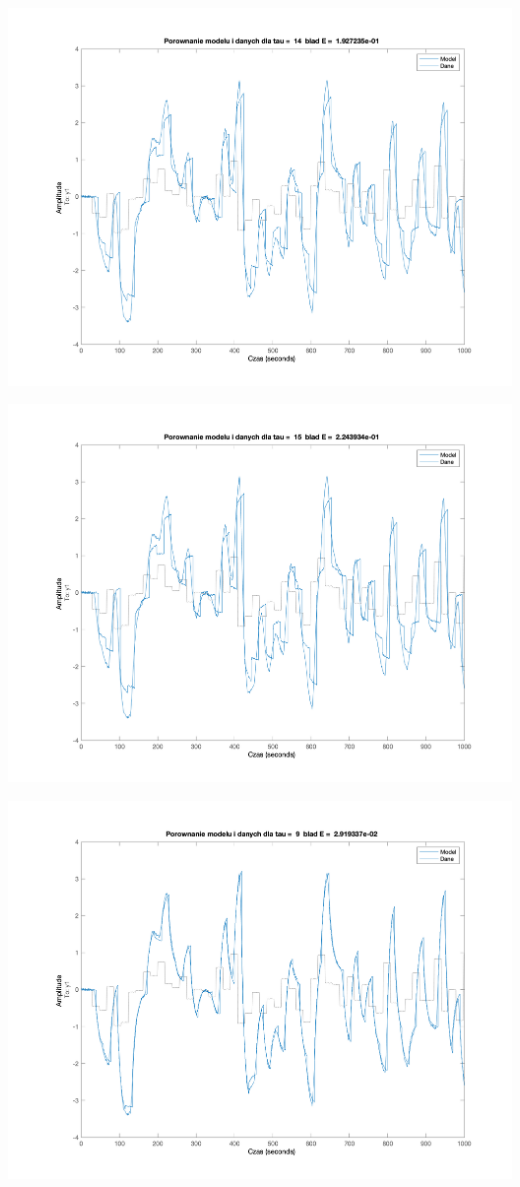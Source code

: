 \documentclass[a4paper, 11pt]{article}
\begin{document}
\begin{enumerate}
 \includegraphics[width=\linewidth]{./ModelsP1/modelTau14.png} 
 
 \includegraphics[width=\linewidth]{./ModelsP1/modelTau15.png} 
 
 \includegraphics[width=\linewidth]{./ModelsP1/modelTau9.png} 
 

\end{enumerate}
\end{document}
